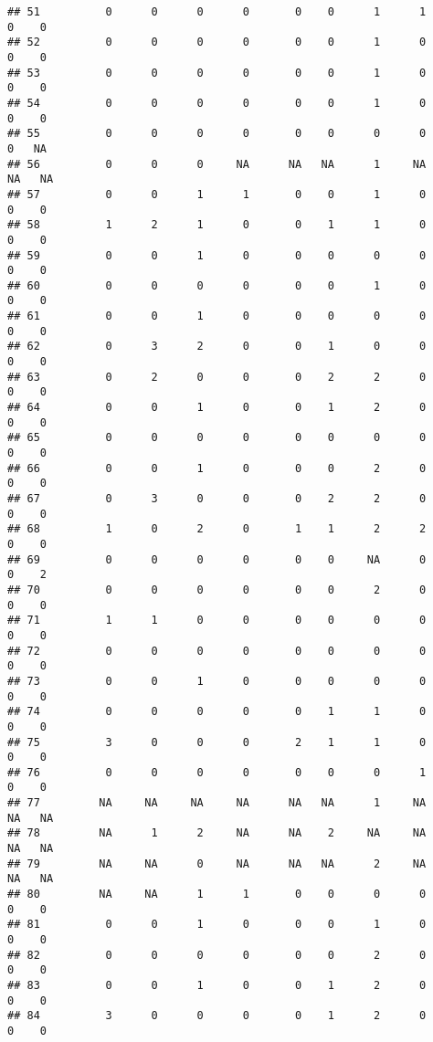 \documentclass[
]{article}
\begin{document}
\begin{verbatim}
## 51          0      0      0      0       0    0      1      1       0    0
## 52          0      0      0      0       0    0      1      0       0    0
## 53          0      0      0      0       0    0      1      0       0    0
## 54          0      0      0      0       0    0      1      0       0    0
## 55          0      0      0      0       0    0      0      0       0   NA
## 56          0      0      0     NA      NA   NA      1     NA      NA   NA
## 57          0      0      1      1       0    0      1      0       0    0
## 58          1      2      1      0       0    1      1      0       0    0
## 59          0      0      1      0       0    0      0      0       0    0
## 60          0      0      0      0       0    0      1      0       0    0
## 61          0      0      1      0       0    0      0      0       0    0
## 62          0      3      2      0       0    1      0      0       0    0
## 63          0      2      0      0       0    2      2      0       0    0
## 64          0      0      1      0       0    1      2      0       0    0
## 65          0      0      0      0       0    0      0      0       0    0
## 66          0      0      1      0       0    0      2      0       0    0
## 67          0      3      0      0       0    2      2      0       0    0
## 68          1      0      2      0       1    1      2      2       0    0
## 69          0      0      0      0       0    0     NA      0       0    2
## 70          0      0      0      0       0    0      2      0       0    0
## 71          1      1      0      0       0    0      0      0       0    0
## 72          0      0      0      0       0    0      0      0       0    0
## 73          0      0      1      0       0    0      0      0       0    0
## 74          0      0      0      0       0    1      1      0       0    0
## 75          3      0      0      0       2    1      1      0       0    0
## 76          0      0      0      0       0    0      0      1       0    0
## 77         NA     NA     NA     NA      NA   NA      1     NA      NA   NA
## 78         NA      1      2     NA      NA    2     NA     NA      NA   NA
## 79         NA     NA      0     NA      NA   NA      2     NA      NA   NA
## 80         NA     NA      1      1       0    0      0      0       0    0
## 81          0      0      1      0       0    0      1      0       0    0
## 82          0      0      0      0       0    0      2      0       0    0
## 83          0      0      1      0       0    1      2      0       0    0
## 84          3      0      0      0       0    1      2      0       0    0

\end{verbatim}
\end{document}
